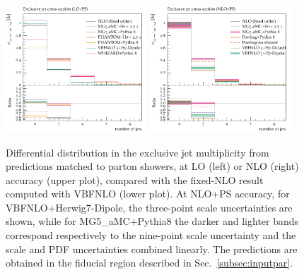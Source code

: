 \documentclass[twocolumn,epjc3]{svjour3} %
\newlength{\width}
\begin{document}
\begin{figure}[hbt]
\centering
\includegraphics[width=0.47\textwidth]{figures/LOPS/jetsexclusive.pdf}
\includegraphics[width=0.47\textwidth]{figures/NLOPS/jetsexclusive.pdf}
\caption{Differential distribution in the
exclusive jet multiplicity
from predictions matched to parton showers, at LO (left) or NLO (right) accuracy (upper plot), compared with the fixed-NLO result computed with {\sc VBFNLO} (lower plot). At NLO+PS accuracy, for
    {\sc VBFNLO}+{\sc Herwig7-Dipole}, the three-point scale uncertainties are shown, while for {\sc MG5\_aMC}+{\sc Pythia8} the darker and lighter bands correspond
    respectively to the nine-point scale uncertainty and the scale and PDF uncertainties combined linearly.
    The predictions are obtained in the fiducial region described in Sec.~\protect\ref{subsec:inputpar}.}
\label{fig:PSnjet}
\end{figure}
\end{document}
